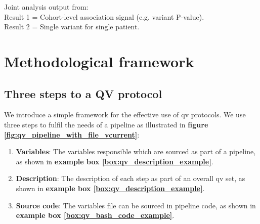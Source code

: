 \begin{tcolorbox}[
    colback=white!0,  %
    colframe=black,  %
    boxrule=1pt,  %
    arc=1mm,  %
    outer arc=1mm,
   title=\textbf{\refstepcounter{myboxcounter}\label{box:pipe}Box \themyboxcounter: Example diagrammatic representation}
]


Joint analysis output from:\\
Result 1 = Cohort-level association signal (e.g. variant P-value). \\
Result 2 = Single variant for single patient.
\end{tcolorbox}


\section{Methodological framework}
\subsection{Three steps to a QV protocol}
We introduce 
a simple framework for the effective use of \ac{qv} protocols.
We use three steps to fulfil the needs of a pipeline as illustrated in 
\textbf{figure 
\ref{fig:qv_pipeline_with_file_vcurrent}}:
\begin{enumerate}
\item \textbf{Variables}: The variables responsible which are sourced as part of a pipeline, as shown in \textbf{example box \ref{box:qv_description_example}}.
\item \textbf{Description}: The description of each step as part of an overall \ac{qv} set, as shown in \textbf{example box \ref{box:qv_description_example}}.
\item \textbf{Source code}: The variables file can be sourced in pipeline code, as shown in \textbf{example box \ref{box:qv_bash_code_example}}.
\end{enumerate}

